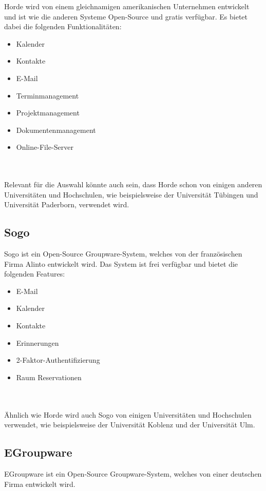 Horde wird von einem gleichnamigen amerikanischen Unternehmen entwickelt und ist wie die anderen Systeme Open-Source und gratis verfügbar. Es bietet dabei die folgenden Funktionalitäten:
\begin{itemize}
    \item Kalender
    \item Kontakte
    \item E-Mail
    \item Terminmanagement
    \item Projektmanagement
    \item Dokumentenmanagement
    \item Online-File-Server
\end{itemize}
\autocite{horde}
\\
\\
Relevant für die Auswahl könnte auch sein, dass Horde schon von einigen anderen Universitäten und Hochschulen, wie beispielsweise der Universität Tübingen und Universität Paderborn, verwendet wird.

\subsection{Sogo}

Sogo ist ein Open-Source Groupware-System, welches von der französischen Firma Alinto entwickelt wird.
Das System ist frei verfügbar und bietet die folgenden Features:

\begin{itemize}
    \item E-Mail
    \item Kalender
    \item Kontakte
    \item Erinnerungen
    \item 2-Faktor-Authentifizierung
    \item Raum Reservationen
\end{itemize}
\autocite{sogo}
\\
\\
Ähnlich wie Horde wird auch Sogo von einigen Universitäten und Hochschulen verwendet, wie beispielsweise der Universität Koblenz und der Universität Ulm.

\subsection{EGroupware}

EGroupware ist ein Open-Source Groupware-System, welches von einer deutschen Firma entwickelt wird.

